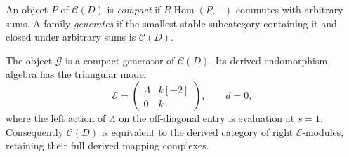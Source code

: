 \begin{definition}
An object \(P\) of \(\mathcal C(D)\) is \emph{compact}
if \(R\operatorname{Hom}(P,-)\) commutes with arbitrary
sums. A family \emph{generates} if the smallest stable
subcategory containing it and closed under arbitrary sums
is \(\mathcal C(D)\).
\end{definition}

\begin{theorem}\label{cyp:thm:generator}
The object \(\mathcal G\) is a compact generator of
\(\mathcal C(D)\). Its derived endomorphism algebra has the
triangular model
\begin{equation}\label{cyp:eq:endomorphisms}
 \mathcal E=
 \begin{pmatrix}\Lambda&k[-2]\\0&k\end{pmatrix},
 \qquad d=0,
\end{equation}
where the left action of \(\Lambda\) on the off-diagonal
entry is evaluation at \(s=1\). Consequently
\(\mathcal C(D)\) is equivalent to the derived category
of right \(\mathcal E\)-modules, retaining their full
derived mapping complexes.
\end{theorem}

